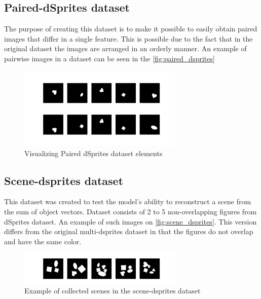 \documentclass{article}
\begin{document}
    \subsection{Paired-dSprites dataset}

    The purpose of creating this dataset is to make it possible to easily
    obtain paired images that differ in a single feature. This is possible
    due to the fact that in the original dataset the images are arranged in
    an orderly manner.
    An example of pairwise images in a dataset can be seen in the
    \autoref{fig:paired_dsprites}
    \begin{figure}[ht]
        \centering
        \includegraphics[width=0.7\textwidth]{img/datasets/paired_dsprites}
        \caption{Visualizing Paired dSprites dataset elements}
        \label{fig:paired_dsprites}
    \end{figure}

    \subsection{Scene-dsprites dataset}

    This dataset was created to test the model's ability to reconstruct
    a scene from the sum of object vectors.
    Dataset consists of 2 to 5 non-overlapping figures from dSprites dataset.
    An example of such images on \autoref{fig:scene_dsprites}. This version differs from
    the original multi-dsprites dataset in that the figures do not overlap
    and have the same color.

    \begin{figure}[ht]
        \centering
        \includegraphics[width=0.7\textwidth]{img/datasets/scene-dsprites}
        \caption{Example of collected scenes in the scene-dsprites dataset}
        \label{fig:scene_dsprites}
    \end{figure}
\end{document}
